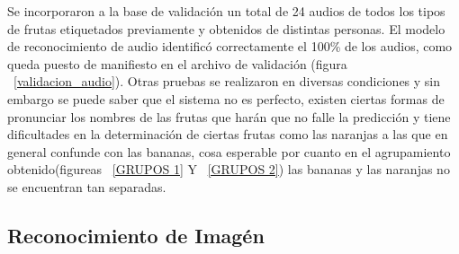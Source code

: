 \documentclass[a4paper, 12pt]{article}
\begin{document}
Se incorporaron a la base de validación un total de 24 audios de todos los tipos de frutas etiquetados previamente y obtenidos de distintas personas. El modelo de reconocimiento de audio identificó correctamente el 100\% de los audios, como queda puesto de manifiesto en el archivo de validación (figura ~\ref{validacion_audio}).
Otras pruebas se realizaron en diversas condiciones y sin embargo se puede saber que el sistema no es perfecto, existen ciertas formas de pronunciar los nombres de las frutas que harán que no falle la predicción y tiene dificultades en la determinación de ciertas frutas como las naranjas a las que en general confunde con las bananas, cosa esperable por cuanto en el agrupamiento obtenido(figureas ~\ref{GRUPOS 1} Y ~\ref{GRUPOS 2}) las bananas y las naranjas no se encuentran tan separadas.

\subsection{Reconocimiento de Imagén}
\end{document}
